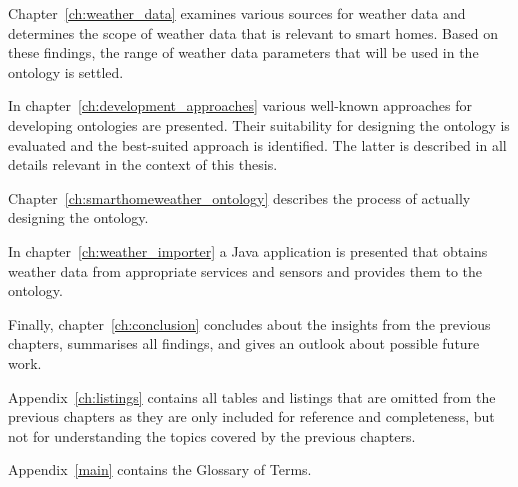 Chapter~\ref{ch:weather_data} examines various sources for weather data and determines the scope of weather data that is relevant to smart homes. Based on these findings, the range of weather data parameters that will be used in the ontology is settled.

In chapter~\ref{ch:development_approaches} various well-known approaches for developing ontologies are presented. Their suitability for designing the \smarthomeweather ontology is evaluated and the best-suited approach is identified. The latter is described in all details relevant in the context of this thesis.

Chapter~\ref{ch:smarthomeweather_ontology} describes the process of actually designing the \smarthomeweather ontology.

In chapter~\ref{ch:weather_importer} a Java application is presented that obtains weather data from appropriate services and sensors and provides them to the \smarthomeweather ontology.

Finally, chapter~\ref{ch:conclusion} concludes about the insights from the previous chapters, summarises all findings, and gives an outlook about possible future work.

Appendix~\ref{ch:listings} contains all tables and listings that are omitted from the previous chapters as they are only included for reference and completeness, but not for understanding the topics covered by the previous chapters.

Appendix~\ref{main} contains the Glossary of Terms.
